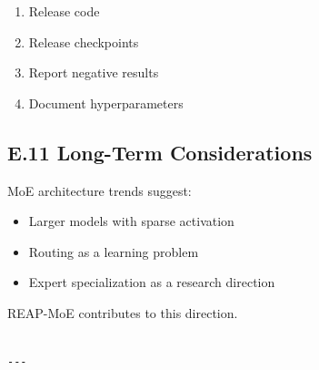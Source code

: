\begin{enumerate}
\item Release code
\item Release checkpoints
\item Report negative results
\item Document hyperparameters

\end{enumerate}
\subsection{E.11 Long-Term Considerations}

MoE architecture trends suggest:
\begin{itemize}
\item Larger models with sparse activation
\item Routing as a learning problem
\item Expert specialization as a research direction

\end{itemize}
REAP-MoE contributes to this direction.
\begin{lstlisting}

---
\end{lstlisting}